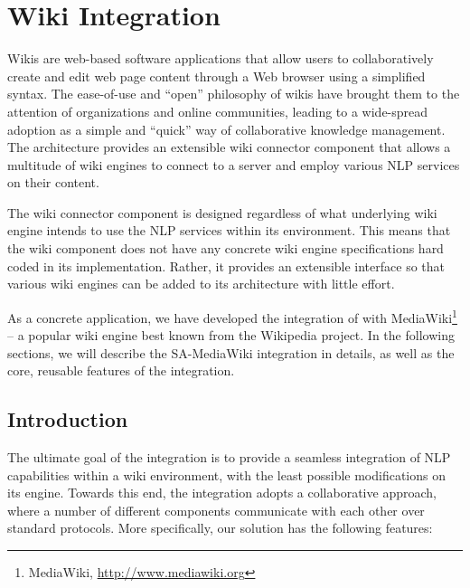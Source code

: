 %
%
%   
% 

\chapter{Wiki Integration}
Wikis are web-based software applications that allow users to collaboratively create and edit web page content through a Web browser using a simplified syntax. The ease-of-use and ``open'' philosophy of wikis have brought them to the attention of organizations and online communities, leading to a wide-spread adoption as a simple and ``quick'' way of collaborative knowledge management. The \sa architecture provides an extensible wiki connector component that allows a multitude of wiki engines to connect to a \sa server and employ various NLP services on their content.

The wiki connector component is designed regardless of what underlying wiki engine intends to use the NLP services within its environment. This means that the wiki component does not have any concrete wiki engine specifications hard coded in its implementation. Rather, it provides an extensible interface so that various wiki engines can be added to its architecture with little effort.

As a concrete application, we have developed the integration of \sa with MediaWiki\footnote{MediaWiki, \url{http://www.mediawiki.org}} -- a popular wiki engine best known from the Wikipedia project. In the following sections, we will describe the SA-MediaWiki integration in details, as well as the core, reusable features of the \wikinlp integration.

\section{Introduction}
The ultimate goal of the \wikinlp integration is to provide a seamless integration of NLP capabilities within a wiki environment, with the least possible modifications on its engine. Towards this end, the \wikinlp integration adopts a collaborative approach, where a number of different components communicate with each other over standard protocols. More specifically, our solution has the following features:

